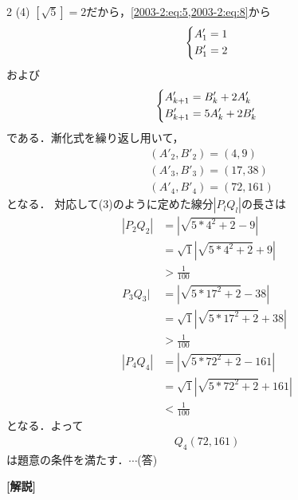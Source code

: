 \documentclass[../../../../main.tex]{subfiles}
\begin{document}
\begin{multicols}{2}
  \vspace{10pt}
  (4)
  $\left[\sqrt{5}\right]=2$だから，\cref{2003-2:eq:5,2003-2:eq:8}から
  \begin{align}
    \begin{dcases}
      A'_1 = 1 \\
      B'_1 = 2
    \end{dcases}
  \end{align}
  および
  \begin{align}
    \begin{dcases}
      A'_{k+1} = B'_{k}+2A'_{k} \\
      B'_{k+1} = 5A'_k+2B'_{k}
    \end{dcases}
  \end{align}
  である．漸化式を繰り返し用いて，
  \begin{align*}
     & (A'_2, B'_2) = (4,9)    \\
     & (A'_3, B'_3) = (17,38)  \\
     & (A'_4, B'_4) = (72,161)
  \end{align*}
  となる．
  対応して(3)のように定めた線分$|P_{l}Q_{l}|$の長さは
  \begin{align*}
    |P_{2}Q_{2}|
     & = |\sqrt{5*4^2+2} - 9|              \\
     & = \sqrt{1}{|\sqrt{5*4^2+2} + 9|}    \\
     & > \frac{1}{100}                     \\
    P_{3}Q_{3}|
     & = |\sqrt{5*17^2+2} - 38|            \\
     & = \sqrt{1}{|\sqrt{5*17^2+2} + 38|}  \\
     & > \frac{1}{100}                     \\
    |P_{4}Q_{4}|
     & = |\sqrt{5*72^2+2} - 161|           \\
     & = \sqrt{1}{|\sqrt{5*72^2+2} + 161|} \\
     & < \frac{1}{100}
  \end{align*}
  となる．よって
  \begin{align*}
    Q_{4}(72,161)
  \end{align*}
  は題意の条件を満たす．$\cdots$(答)

  \vspace{10pt}

  {\bf[解説]}

  \newpage
\end{multicols}
\end{document}
